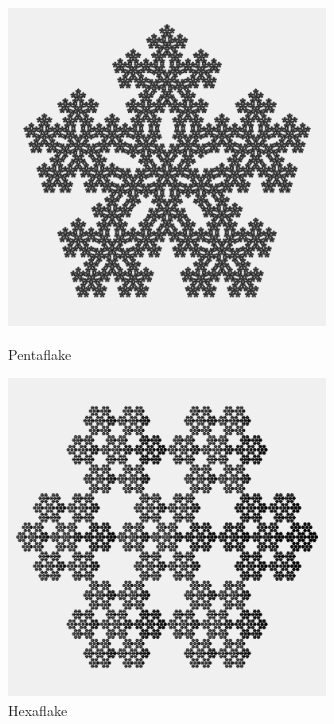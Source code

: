 \documentclass[dvipdfmx]{jsarticle}
\theoremstyle{definition}
\begin{document}
\begin{figure}[H]
    \begin{minipage}{0.49\hsize}
        \centering
        \includegraphics[width=0.75\textwidth]{figure/others/relatives/pentaflake.png}
        \caption{Pentaflake}
        \label{pic_penfr}
    \end{minipage}
    \begin{minipage}{0.49\hsize}
        \centering
        \includegraphics[width=0.75\textwidth]{figure/others/relatives/hexaflake.png}
        \caption{Hexaflake}
        \label{pic_hexfr}
    \end{minipage}
\end{figure}
\end{document}
